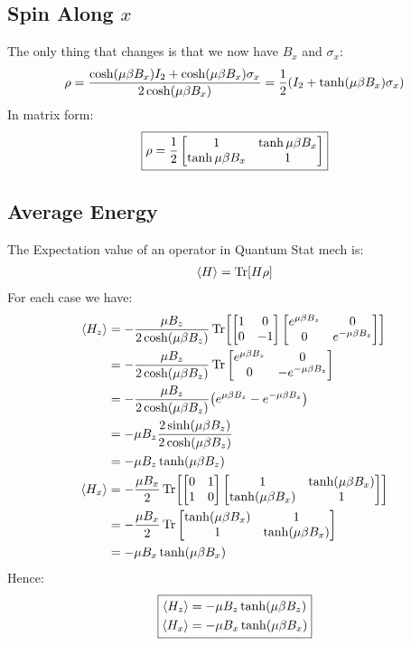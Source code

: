 \documentclass[12pt]{article}
\begin{document}
\subsection{Spin Along $x$}
The only thing that changes is that we now have $B_x$ and $\sigma_x$:
\begin{align*}
  \rho=\frac{\cosh(\mu\beta B_x)I_2+\cosh(\mu\beta B_x)\sigma_x}
  {2\cosh(\mu\beta B_x)}=
  \frac12\qty(I_2+\tanh(\mu\beta B_x)\sigma_x)
\end{align*}
In matrix form:
\begin{align}
  \boxed{\rho=\frac12\bmqty{1&\tanh\mu\beta B_x\\\tanh\mu\beta B_x&1}}
\end{align}

\subsection{Average Energy}
The Expectation value of an operator in Quantum Stat mech is:
\begin{align*}
  \ev{H}=\Tr[H\rho]
\end{align*}
For each case we have:
\begin{align*}
  \ev{H_z}&=-\frac{\mu B_z}{2\cosh(\mu\beta B_z)}
  \Tr[\bmqty{1&0\\0&-1}\bmqty{e^{\mu\beta B_z}&0\\0&e^{-\mu\beta B_z}}]\\
  &=-\frac{\mu B_z}{2\cosh(\mu\beta B_z)}
  \Tr\bmqty{e^{\mu\beta B_z}&0\\0&-e^{-\mu\beta B_z}}\\
  &=-\frac{\mu B_z}{2\cosh(\mu\beta B_z)}
  \qty(e^{\mu\beta B_z}-e^{-\mu\beta B_z})\\
  &=-\mu B_z\frac{2\sinh(\mu\beta B_z)}{2\cosh(\mu\beta B_z)}\\
  &=-\mu B_z\tanh(\mu\beta B_z)\\
  \ev{H_x}&=-\frac{\mu B_x}{2}
  \Tr[\bmqty{0&1\\1&0}\bmqty{1&\tanh(\mu\beta B_x)\\\tanh(\mu\beta B_x)&1}]\\
  &=-\frac{\mu B_x}{2}
  \Tr\bmqty{\tanh(\mu\beta B_x)&1\\1&\tanh(\mu\beta B_x)}\\
  &=-\mu B_x\tanh(\mu\beta B_x)\\
\end{align*}
Hence:
\begin{equation}
  \boxed{
    \begin{aligned}
      \ev{H_z}&=-\mu B_z\tanh(\mu\beta B_z)\\
      \ev{H_x}&=-\mu B_x\tanh(\mu\beta B_x)
    \end{aligned}
  }
\end{equation}
\end{document}
